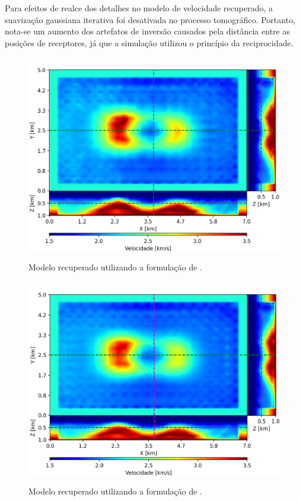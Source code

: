 Para efeitos de realce dos detalhes no modelo de velocidade recuperado, a suavização gaussiana iterativa foi desativada no processo tomográfico. Portanto, nota-se um aumento dos artefatos de inversão causados pela distância entre as posições de receptores, já que a simulação utilizou o princípio da reciprocidade.  

\begin{figure}[H]
	\centering
	\includegraphics[width=12cm,height=9cm]{Imgs/Resultados/fim_refined.png}
	\caption{Modelo recuperado utilizando a formulação de .}
	\label{fig:fim_refined}	
\end{figure}

\begin{figure}[H]
	\centering
	\includegraphics[width=12cm,height=9cm]{Imgs/Resultados/fsm_refined.png}
	\caption{Modelo recuperado utilizando a formulação de .}
	\label{fig:fsm_refined}	
\end{figure}
